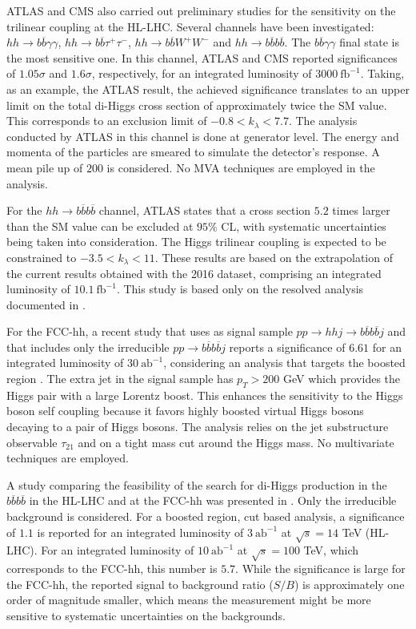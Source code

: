 ATLAS and CMS also carried out preliminary studies for the sensitivity on the trilinear coupling at the HL-LHC. Several channels have been investigated: $hh\rightarrow  b\overline{b}\gamma\gamma$, $hh\rightarrow b\overline{b} \tau^+ \tau^-$, $hh\rightarrow b\overline{b} W^+ W^-$ and $hh\rightarrow  b\overline{b}b\overline{b}$. The $b\overline{b}\gamma\gamma$ final state is the most sensitive one. In this channel, ATLAS and CMS reported significances of $1.05\sigma$ and $1.6\sigma$, respectively, for an integrated luminosity of $3000~\text{fb}^{-1}$. Taking, as an example, the ATLAS result, the achieved significance translates to an upper limit on the total di-Higgs cross section of approximately twice the SM value. This corresponds to an exclusion limit of $-0.8<k_{\lambda}<7.7$. The analysis conducted by ATLAS in this channel is done at generator level. The energy and momenta of the particles are smeared to simulate the detector's response. A mean pile up of $200$ is considered. No MVA techniques are employed in the analysis. 

For the $hh\rightarrow  b\overline{b}b\overline{b}$ channel, ATLAS states that a cross section $5.2$ times larger than the SM value can be excluded at $95\%$ CL, with systematic uncertainties being taken into consideration. The Higgs trilinear coupling is expected to be constrained to $-3.5<k_{\lambda}<11$. These results are based on the extrapolation of the current results obtained with the 2016 dataset, comprising an integrated luminosity of $10.1~\text{fb}^{-1}$. This study is based only on the resolved analysis documented in \cite{hh2bbbbATLAS}.

For the FCC-hh, a recent study that uses as signal sample $pp\rightarrow hhj\rightarrow b\overline{b}b\overline{b}j$ and that includes only the irreducible $pp\rightarrow b\overline{b}b\overline{b}j$ reports a significance of $6.61$ for an integrated luminosity of $30~\text{ab}^{-1}$, considering an analysis that targets the boosted region \cite{hh+jet_100TeV}. The extra jet in the signal sample has $p_T>200$ GeV which provides the Higgs pair with a large Lorentz boost. This enhances the sensitivity to the Higgs boson self coupling because it favors highly boosted virtual Higgs bosons decaying to a pair of Higgs bosons. The analysis relies on the jet substructure observable $\tau_{21}$ and on a tight mass cut around the Higgs mass. No multivariate techniques are employed. 

A study comparing the feasibility of the search for di-Higgs production in the $b\overline{b}b\overline{b}$ in the HL-LHC and at the FCC-hh was presented in \cite{hhFeasibility1_100TeV}. Only the irreducible background is considered. For a boosted region, cut based analysis, a significance of $1.1$ is reported for an integrated luminosity of $3~\text{ab}^{-1}$ at $\sqrt{s}=14$ TeV (HL-LHC). For an integrated luminosity of $10~\text{ab}^{-1}$ at $\sqrt{s}=100$ TeV, which corresponds to the FCC-hh, this number is $5.7$. While the significance is large for the FCC-hh, the reported signal to background ratio ($S/B$) is approximately one order of magnitude smaller, which means the measurement might be more sensitive to systematic uncertainties on the backgrounds. 


